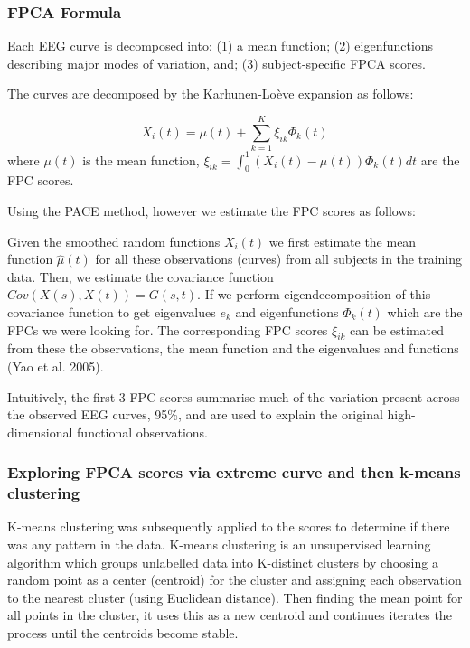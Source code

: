 \documentclass{article}
\begin{document}
\subsubsection{FPCA Formula}\label{fpca-formula}

Each EEG curve is decomposed into: (1) a mean function; (2)
eigenfunctions describing major modes of variation, and; (3)
subject-specific FPCA scores.

The curves are decomposed by the Karhunen-Loève expansion as follows:

\[X_i (t) = \mu (t) + \sum_{k=1}^K \xi_{ik} \Phi_k (t)\] where
\(\mu(t)\) is the mean function,
\(\xi_{ik} = \int_0^1 (X_i(t) - \mu(t))\Phi_k(t)  dt\) are the FPC
scores.

Using the PACE method, however we estimate the FPC scores as follows:

Given the smoothed random functions \(X_i(t)\) we first estimate the
mean function \(\hat\mu(t)\) for all these observations (curves) from
all subjects in the training data. Then, we estimate the covariance
function \(Cov(X (s), X (t)) = G(s, t)\). If we perform
eigendecomposition of this covariance function to get eigenvalues
\(e_k\) and eigenfunctions \(\Phi_k(t)\) which are the FPCs we were
looking for. The corresponding FPC scores \(\xi_{ik}\) can be estimated
from these the observations, the mean function and the eigenvalues and
functions (Yao et al. 2005).

Intuitively, the first 3 FPC scores summarise much of the variation
present across the observed EEG curves, 95\%, and are used to explain
the original high-dimensional functional observations.

\subsubsection{Exploring FPCA scores via extreme curve and then k-means
clustering}\label{exploring-fpca-scores-via-extreme-curve-and-then-k-means-clustering}

K-means clustering was subsequently applied to the scores to determine
if there was any pattern in the data. K-means clustering is an
unsupervised learning algorithm which groups unlabelled data into
K-distinct clusters by choosing a random point as a center (centroid)
for the cluster and assigning each observation to the nearest cluster
(using Euclidean distance). Then finding the mean point for all points
in the cluster, it uses this as a new centroid and continues iterates
the process until the centroids become stable.
\end{document}
